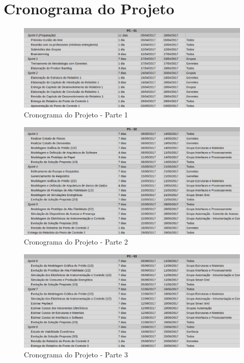 \section{Cronograma do Projeto}
\begin{figure}[!h]
 \centering	\includegraphics[keepaspectratio=true,scale=0.45]{figuras/c1.eps}
 \caption{Cronograma do Projeto - Parte 1}
 \label{fig022}
\end{figure}
\pagebreak
\begin{figure}[!h]
 \centering	\includegraphics[keepaspectratio=true,scale=0.45]{figuras/c2.eps}
 \caption{Cronograma do Projeto - Parte 2}
 \label{fig022}
\end{figure}

\begin{figure}[!h]
 \centering	\includegraphics[keepaspectratio=true,scale=0.45]{figuras/c3.eps}
 \caption{Cronograma do Projeto - Parte 3}
 \label{fig022}
\end{figure}
